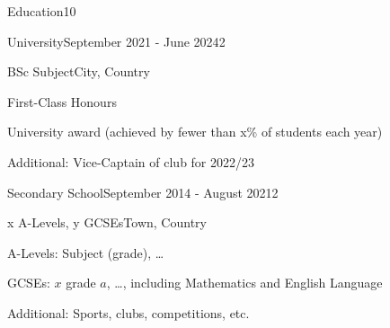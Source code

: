 \documentclass[10pt,a4paper]{CV}
\begin{document}

\begin{Section}{Education}{10}
    \begin{Institution}{University}{September 2021 - June 2024}{2}
        \begin{Position}{BSc Subject}{City, Country}
            \item First-Class Honours
            \item University award (achieved by fewer than x\% of students each year)
            \item Additional: Vice-Captain of club for 2022/23
        \end{Position}
    \end{Institution}

    \begin{Institution}{Secondary School}{September 2014 - August 2021}{2}
        \begin{Position}{x A-Levels, y GCSEs}{Town, Country}
            \item A-Levels: Subject (grade), \dots
            \item GCSEs: $x$ grade $a$, \dots, including Mathematics and English Language
            \item Additional: Sports, clubs, competitions, etc.
        \end{Position}
    \end{Institution}
\end{Section}
\end{document}
